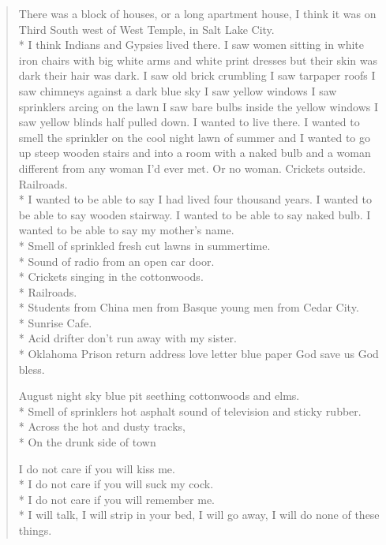 \documentclass[english,11pt,letterpaper,onecolumn]{scrbook}
\begin{document}
\begin{verse}

There was a block of houses, or a long apartment house, I think it was on Third South west of West Temple, in Salt Lake City. \\*
I think Indians and Gypsies lived there.  I saw women sitting in white iron chairs with big white arms and white print dresses but their skin was dark their hair was dark.  I saw old brick crumbling I saw tarpaper roofs I saw chimneys against a dark blue sky I saw yellow windows I saw sprinklers arcing on the lawn I saw bare bulbs inside the yellow windows I saw yellow blinds half pulled down.  I wanted to live there.  I wanted to smell the sprinkler on the cool night lawn of summer and I wanted to go up steep wooden stairs and into a room with a naked bulb and a woman different from any woman I'd ever met.  Or no woman.  Crickets outside.  Railroads. \\*
I wanted to be able to say I had lived four thousand years.  I wanted to be able to say wooden stairway.  I wanted to be able to say naked bulb.  I wanted to be able to say my mother's name. \\*
Smell of sprinkled fresh cut lawns in summertime. \\*
Sound of radio from an open car door. \\*
Crickets singing in the cottonwoods. \\*
Railroads. \\*
Students from China men from Basque young men from Cedar City. \\*
Sunrise Cafe. \\*
Acid drifter don't run away with my sister. \\*
Oklahoma Prison return address love letter blue paper God save us God bless.



August night sky blue pit seething cottonwoods and elms. \\*
Smell of sprinklers hot asphalt sound of television and sticky rubber. \\*
Across the hot and dusty tracks, \\*
On the drunk side of town



I do not care if you will kiss me. \\*
I do not care if you will suck my cock. \\*
I do not care if you will remember me. \\*
I will talk, I will strip in your bed, I will go away, I will do none of these things.




\end{verse}
\end{document}
